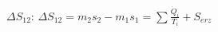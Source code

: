 \( \Delta S_{12} \):  
\( \Delta S_{12} = m_2 s_2 - m_1 s_1 = \sum \frac{\dot{Q}_i}{T_i} + S_{erz} \)